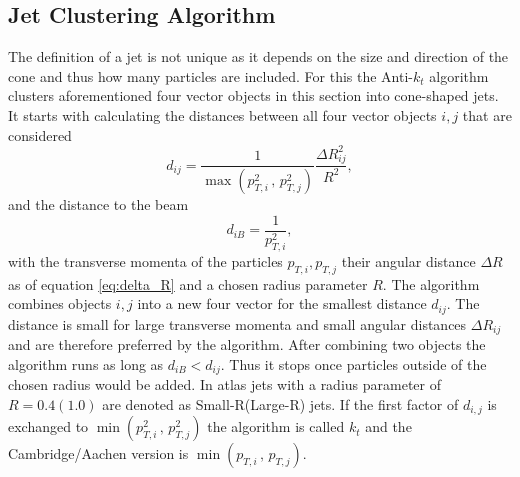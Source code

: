 \subsection{Jet Clustering Algorithm}\label{sec:anti_kt}
The definition of a jet is not unique as it depends on the size and direction of the cone and thus how many particles are included. For this the Anti-$k_t$ algorithm \citep{cacciari2008anti} clusters aforementioned four vector objects in this section into cone-shaped jets. It starts with calculating the distances between all four vector objects $i,j$ that are considered
\begin{equation}
  d_{ij}=\frac{1}{\max(p_{T,i}^{2}\,,\,p_{T,j}^{2})} \frac{\Delta R_{ij}^2}{R^2},
\end{equation}
and the distance to the beam
\begin{equation}
  d_{iB}=\frac{1}{p_{T,i}^{2}},
\end{equation}
with the transverse momenta of the particles $p_{T,i},p_{T,j}$ their angular distance $\Delta R$ as of equation \ref{eq:delta_R} and a chosen radius parameter $R$. The algorithm combines objects $i,j$ into a new four vector for the smallest distance $d_{ij}$. The distance is small for large transverse momenta \pt and small angular distances $\Delta R_{ij}$ and are therefore preferred by the algorithm. After combining two objects the algorithm runs as long as $d_{iB}<d_{ij}$. Thus it stops once particles outside of the chosen radius would be added. In \ac{atlas} jets with a radius parameter of $R=0.4 (1.0)$ are denoted as Small-R(Large-R) jets. If the first factor of $d_{i,j}$ is exchanged to $\min(p_{T,i}^{2}\,,\,p_{T,j}^{2})$ the algorithm is called $k_t$ and the Cambridge/Aachen version is $\min(p_{T,i}\,,\,p_{T,j})$.



